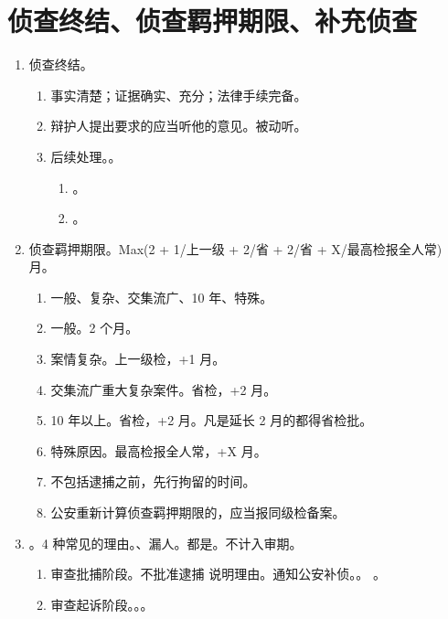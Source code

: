 \section{侦查终结、侦查羁押期限、补充侦查}
\begin{enumerate}
  \item 侦查终结。
        \begin{enumerate}
          \item 事实清楚；证据确实、充分；法律手续完备。
          \item 辩护人提出要求的应当听他的意见。被动听。
          \item 后续处理。。
                \begin{enumerate}
                  \item {}。
                  \item {}。
                \end{enumerate}
        \end{enumerate}
  \item 侦查羁押期限。Max(2 + 1/上一级 + 2/省 + 2/省 + X/最高检报全人常) 月。
        \begin{enumerate}
          \item 一般、复杂、交集流广、10 年、特殊。
          \item 一般。2 个月。
          \item 案情复杂。上一级检，+1 月。
          \item 交集流广重大复杂案件。省检，+2 月。
          \item 10 年以上。省检，+2 月。凡是延长 2 月的都得省检批。
          \item 特殊原因。最高检报全人常，+X 月。
          \item 不包括逮捕之前，先行拘留的时间。
          \item 公安重新计算侦查羁押期限的，应当报同级检备案。
        \end{enumerate}
  \item {}。4 种常见的理由。、漏人。都是。不计入审期。
        \begin{enumerate}
          \item 审查批捕阶段。不批准逮捕 \yjt \yi 说明理由。\er 通知公安补侦。。
                。
          \item 审查起诉阶段。。。
                \begin{enumerate}

\end{enumerate}
\end{enumerate}
\end{enumerate}
